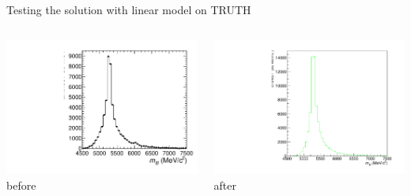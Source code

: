 \documentclass[9pt,usenames,dvipsnames]{beamer}
\begin{document}
\begin{frame}{Testing the solution with linear model on TRUTH}

	\begin{columns}[c]
\begin{center}
	\includegraphics[width=\textwidth]{assets/Distribution_Bmass_RR_3pimu_FullTRUE}
\\ before
\end{center}
		
		\begin{center}
	\includegraphics[width= \textwidth]{./assets/linear_model_3pimu} 
	\\after
		\end{center}
	\end{columns}
\end{frame}
\end{document}
